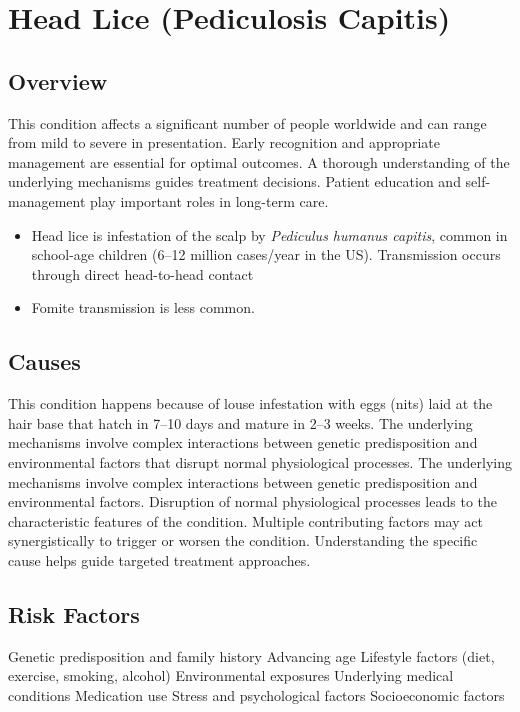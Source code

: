 \chapter{Head Lice (Pediculosis Capitis)}
\label{sec:Head Lice}

\section{Overview}
This condition affects a significant number of people worldwide and can range from mild to severe in presentation. Early recognition and appropriate management are essential for optimal outcomes. A thorough understanding of the underlying mechanisms guides treatment decisions. Patient education and self-management play important roles in long-term care.

\begin{itemize}[noitemsep]
  \item Head lice is infestation of the scalp by \textit{Pediculus humanus capitis}, common in school-age children (6--12 million cases/year in the US). Transmission occurs through direct head-to-head contact
  \item Fomite transmission is less common.
\end{itemize}
\section{Causes}
This condition happens because of louse infestation with eggs (nits) laid at the hair base that hatch in 7--10 days and mature in 2--3 weeks. The underlying mechanisms involve complex interactions between genetic predisposition and environmental factors that disrupt normal physiological processes. The underlying mechanisms involve complex interactions between genetic predisposition and environmental factors. Disruption of normal physiological processes leads to the characteristic features of the condition. Multiple contributing factors may act synergistically to trigger or worsen the condition. Understanding the specific cause helps guide targeted treatment approaches.
\section{Risk Factors}
Genetic predisposition and family history Advancing age Lifestyle factors (diet, exercise, smoking, alcohol) Environmental exposures Underlying medical conditions Medication use Stress and psychological factors Socioeconomic factors

